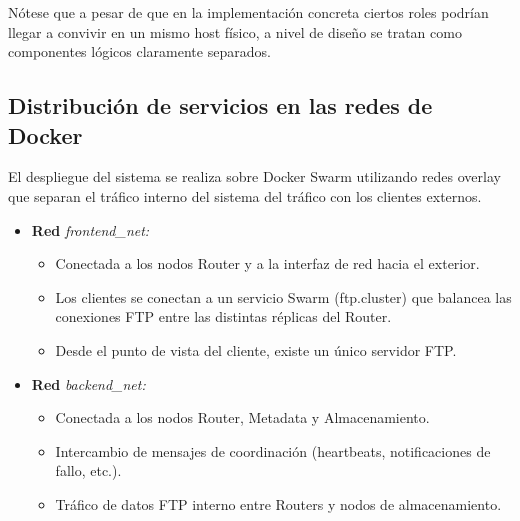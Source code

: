 \documentclass{article}
\begin{document}
 Nótese que a pesar de que en la implementación concreta ciertos roles podrían llegar a convivir en un mismo host físico, a nivel de diseño se tratan como componentes lógicos claramente separados.

\subsection{Distribución de servicios en las redes de Docker}

El despliegue del sistema se realiza sobre Docker Swarm utilizando redes overlay que separan el tráfico interno del sistema del tráfico con los clientes externos.

\begin{itemize}
    \item \textbf{Red} \textit{frontend\_net:}
    \begin{itemize}
        \item Conectada a los nodos Router y a la interfaz de red hacia el exterior.
        \item Los clientes se conectan a un servicio Swarm (ftp.cluster) que balancea las conexiones FTP entre las distintas réplicas del Router.
        \item Desde el punto de vista del cliente, existe un único servidor FTP.
    \end{itemize} 
    \item \textbf{Red} \textit{backend\_net:}
    \begin{itemize}
        \item Conectada a los nodos Router, Metadata y Almacenamiento.
        \item Intercambio de mensajes de coordinación (heartbeats, notificaciones de fallo, etc.).
        \item Tráfico de datos FTP interno entre Routers y nodos de almacenamiento.
    \end{itemize}
\end{itemize}
\end{document}
